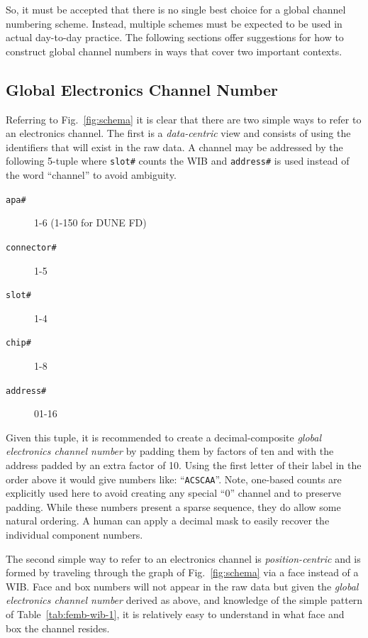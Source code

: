 \documentclass[pdftex,12pt,letter]{article}
\begin{document}
So, it must be accepted that there is no single best choice for a
global channel numbering scheme.  Instead, multiple schemes must be
expected to be used in actual day-to-day practice.  The following
sections offer suggestions for how to construct global channel numbers
in ways that cover two important contexts.

\subsection{Global Electronics Channel Number}

Referring to Fig.~\ref{fig:schema} it is clear that there are two
simple ways to refer to an electronics channel.  The first is a
\textit{data-centric} view and consists of using the identifiers that
will exist in the raw data.  A channel may be addressed by the
following 5-tuple where \texttt{slot\#} counts the WIB and
\texttt{address\#} is used instead of the word ``channel'' to avoid
ambiguity.

\begin{description}
\item[\texttt{apa\#}] 1-6 (1-150 for DUNE FD)
\item[\texttt{connector\#}] 1-5
\item[\texttt{slot\#}] 1-4
\item[\texttt{chip\#}] 1-8
\item[\texttt{address\#}] 01-16
\end{description}

\noindent 
Given this tuple, it is recommended to create a decimal-composite
\textit{global electronics channel number} by padding them by factors
of ten and with the address padded by an extra factor of 10.  Using
the first letter of their label in the order above it would give
numbers like: ``\texttt{ACSCAA}''.  Note, one-based counts are
explicitly used here to avoid creating any special ``0'' channel and
to preserve padding.
While these numbers present a sparse sequence, they do allow some
natural ordering.  A human can apply a decimal mask to easily recover
the individual component numbers.

The second simple way to refer to an electronics channel is
\textit{position-centric} and is formed by traveling through the graph of
Fig.~\ref{fig:schema} via a face instead of a WIB.  Face and box
numbers will not appear in the raw data but given the \textit{global
electronics channel number} derived as above, and knowledge of the
simple pattern of Table~\ref{tab:femb-wib-1}, it is relatively easy to
understand in what face and box the channel resides.
\end{document}
